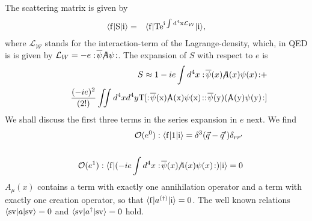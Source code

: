 The scattering matrix is given by
 \begin{eqnarray*}
 \langle{\rm f}\vert\rm S\vert{\rm i}\rangle&=&\langle{\rm f}\vert\rm {T}
 e^{i\int{d^4x\mathcal{L_W}}}\vert{\rm i}\rangle,
 \end{eqnarray*}
where
$\mathcal{L_W}$ stands for the interaction-term of the Lagrange-density, which, in
QED is is given by ${\mathcal L_W} = -e:\!\overline \psi\rlap{/}A\psi \!:$.
The expansion of $S$ with respect to $e$ is
 \begin{eqnarray*}
 &&S \approx 1 - ie\int{d^4x:\!\overline\psi(x) \rlap{/}A(x)\psi(x)\!:} +\\
&& \qquad
 {(-ie)^2\over(2!)} \int\!\!\!\int{d^4xd^4y\rm{T}[:\!\overline\psi(x) \rlap{/}A(x)\psi(x)\!:
 :\!\overline\psi(y)(\rlap{/}A(y)\psi(y)\!:]}\\
 \end{eqnarray*}
 We shall discuss the first three terms in the series expansion in $e$ next.
 We find
 \begin{eqnarray*}
 &&{\mathcal O}(e^0): \langle{\rm f}\vert 1\vert{\rm i}\rangle=\delta^3(\vec q -
 \vec q')\delta_{rr'}\\
 \\
 &&{\mathcal O}(e^1): \langle{\rm f}\vert(-ie\int{d^4x:\!\overline\psi(x)\rlap{/}A(x)\psi(x)\!:)
 \vert{\rm i}\rangle} = 0\\
 \end{eqnarray*}
$A_{\mu}(x)$ contains a term with exactly one annihilation
operator and a term with exactly one creation operator, so that
$\langle{\rm f}\vert a^{(\dagger)}\vert{\rm i}\rangle = 0$.
The well known relations $\langle{\rm sv}\vert a\vert{\rm sv}\rangle = 0$
and $\langle{\rm sv}\vert a^\dagger\vert{\rm sv}\rangle = 0$ hold.


